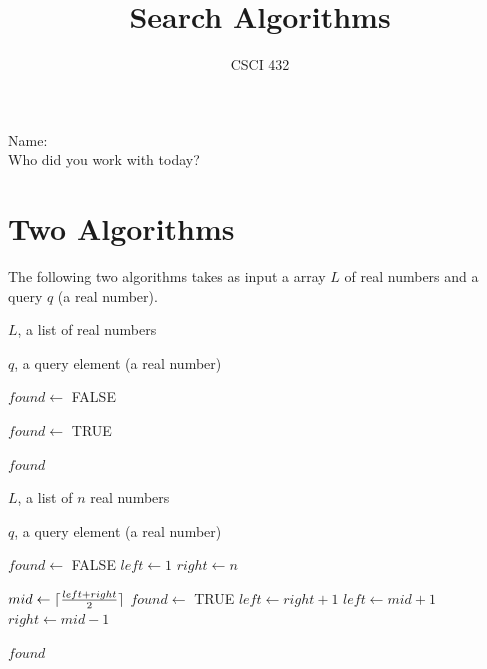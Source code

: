 \documentclass{article}
\title{Search Algorithms}
\author{CSCI 432}
\begin{document}
\maketitle

\noindent
Name:\\
Who did you work with today?

\section*{Two Algorithms}

The following two algorithms takes as input a array $L$ of real numbers
and a query $q$ (a real number).

\begin{minipage}{0.46\textwidth}
\begin{algorithm}[H]
    \caption{Search I}
    \begin{algorithmic}[1]
        \REQUIRE $L$, a list of real numbers

        \ENSURE $q$, a query element (a real number)

        \STATE $found \gets$ FALSE

                \STATE $found \gets$ TRUE
            \ENDIF
        \ENDFOR

        \RETURN $found$

    \end{algorithmic}
\end{algorithm}
\end{minipage}%
\hfill%
\begin{minipage}{0.46\textwidth}
\begin{algorithm}[H]
    \caption{Search II}
    \begin{algorithmic}[1]
        \REQUIRE $L$, a list of $n$ real numbers

        \ENSURE $q$, a query element (a real number)

        \STATE $found \gets$ FALSE
        \STATE $left \gets 1$
        \STATE $right \gets n$

            \STATE $mid \gets \lceil {\frac{left + right}{2}} \rceil$
                \STATE $found \gets$ TRUE
                \STATE $left \gets right +1$
                \STATE $left \gets mid+1$
            \ELSE
                \STATE $right \gets mid-1$
            \ENDIF
        \ENDWHILE

        \RETURN $found$

    \end{algorithmic}
\end{algorithm}
\end{minipage}
\end{document}
